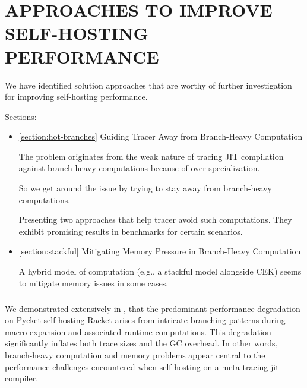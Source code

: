 \chapter[\texorpdfstring{APPROACHES TO IMPROVE SELF-HOSTING PERFORMANCE}
                          {7. Improving Performance}]{APPROACHES TO IMPROVE SELF-HOSTING PERFORMANCE}

	\label{chapter:solution}

  \begin{chaptersynopsis}\footnotesize
    \footnotesize

    We have identified solution approaches that are worthy of further investigation for improving self-hosting performance.

    Sections:
		\begin{itemize}
			\item \ref{section:hot-branches} Guiding Tracer Away from Branch-Heavy Computation

        The problem originates from the weak nature of tracing JIT compilation against branch-heavy computations because of over-specialization.

        So we get around the issue by trying to stay away from branch-heavy computations.

        Presenting two approaches that help tracer avoid such computations. They exhibit promising results in benchmarks for certain scenarios.
			\item \ref{section:stackful} Mitigating Memory Pressure in Branch-Heavy Computation

				A hybrid model of computation (e.g., a stackful model alongside CEK) seems to mitigate memory issues in some cases.
		\end{itemize}
  \end{chaptersynopsis}

  \paragraph{}%
    We demonstrated extensively in , that the predominant performance degradation on Pycket self-hosting Racket arises from intricate branching patterns during macro expansion and associated runtime computations. This degradation significantly inflates both trace sizes and the GC overhead. In other words, branch-heavy computation and memory problems appear central to the performance challenges encountered when self-hosting on a meta-tracing \gls{jit} compiler.

